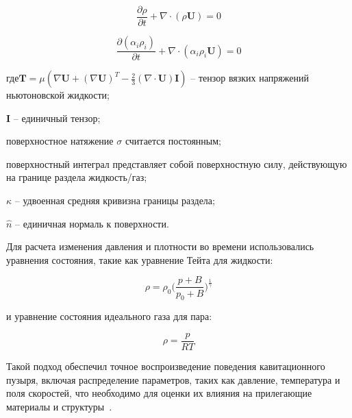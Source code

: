 \begin{equation}
    \frac{\partial \rho}{\partial t} + \nabla \cdot (\rho \mathbf{U}) = 0
\end{equation}

\begin{equation}
    \frac{\partial (\alpha_i \rho_i)}{\partial t} + \nabla \cdot (\alpha_i \rho_i \mathbf{U}) = 0
\end{equation}
\vspace{1em}

\noindent где\quad $\mathbf{T} = \mu \left( \nabla \mathbf{U} + (\nabla \mathbf{U})^T - \frac{2}{3} (\nabla \cdot \mathbf{U}) \mathbf{I} \right)$ – тензор вязких напряжений ньютоновской жидкости;

$\mathbf{I}$ – единичный тензор;

поверхностное натяжение $\sigma$ считается постоянным;

поверхностный интеграл представляет собой поверхностную силу, действующую на границе раздела жидкость/газ;

$\kappa$ – удвоенная средняя кривизна границы раздела;

$\hat{n}$ – единичная нормаль к поверхности.

Для расчета изменения давления и плотности во времени использовались уравнения состояния, такие как уравнение Тейта для жидкости:

\vspace{1em}
\begin{equation}
    \rho = \rho_0 \bigg(\frac{p + B}{p_0 + B}\bigg)^{\frac{1}{\gamma}}
\end{equation}
\vspace{1em}

и уравнение состояния идеального газа для пара:

\vspace{1em}
\begin{equation}
    \rho = \frac{p}{R T}
\end{equation}
\vspace{1em}

Такой подход обеспечил точное воспроизведение поведения кавитационного пузыря, включая распределение параметров, таких как давление, температура и поля скоростей, что необходимо для оценки их влияния на прилегающие материалы и структуры~\cite{10.1016/j.compfluid.2015.11.008}.

